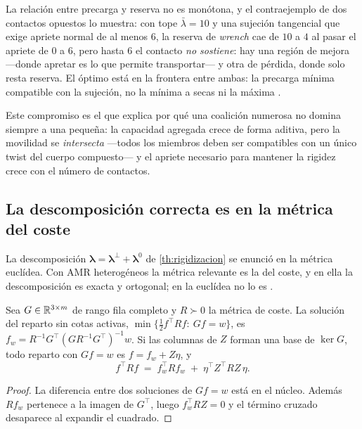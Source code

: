 \begin{observacion}
\label{obs:agarre-no-monotono}
La relación entre precarga y reserva no es monótona, y el contraejemplo de dos contactos
opuestos lo muestra: con tope $\bar\lambda=10$ y una sujeción tangencial que
exige apriete normal de al menos $6$, la reserva de \emph{wrench} cae de $10$ a
$4$ al pasar el apriete de $0$ a $6$, pero hasta $6$ el contacto \emph{no
sostiene}: hay una región de mejora —donde apretar es lo que permite
transportar— y otra de pérdida, donde solo resta reserva. El óptimo está en la
frontera entre ambas: la precarga mínima compatible con la sujeción, no la
mínima a secas ni la máxima \cite{mayorga2026m1}.
\end{observacion}

Este compromiso es el que explica por qué una coalición numerosa no domina
siempre a una pequeña: la capacidad agregada crece de forma aditiva, pero la
movilidad se \emph{intersecta} —todos los miembros deben ser compatibles con un
único twist del cuerpo compuesto— y el apriete necesario para mantener la
rigidez crece con el número de contactos.

\subsection{La descomposición correcta es en la métrica del coste}

La descomposición $\bm\lambda=\bm\lambda^{\perp}+\bm\lambda^{0}$ de
\cref{th:rigidizacion} se enunció en la métrica euclídea. Con AMR heterogéneos
la métrica relevante es la del coste, y en ella la descomposición es exacta y
ortogonal; en la euclídea no lo es \cite{mayorga2026m1}.

\begin{proposicion}
\label{pr:descomposicion-R}
Sea $G\in\mathbb{R}^{3\times m}$ de rango fila completo y $R\succ0$ la métrica de coste.
La solución del reparto sin cotas activas,
$\min\{\tfrac12 f^{\!\top}Rf:\ Gf=w\}$, es
$f_w=R^{-1}G^{\!\top}(GR^{-1}G^{\!\top})^{-1}w$. Si las columnas de $Z$ forman una
base de $\ker G$, todo reparto con $Gf=w$ es $f=f_w+Z\eta$, y
\[
  f^{\!\top}Rf\;=\;f_w^{\!\top}Rf_w\;+\;\eta^{\!\top}Z^{\!\top}RZ\,\eta .
\]
\end{proposicion}

\begin{proof}
La diferencia entre dos soluciones de $Gf=w$ está en el núcleo. Además $Rf_w$
pertenece a la imagen de $G^{\!\top}$, luego $f_w^{\!\top}RZ=0$ y el término
cruzado desaparece al expandir el cuadrado.
\end{proof}

